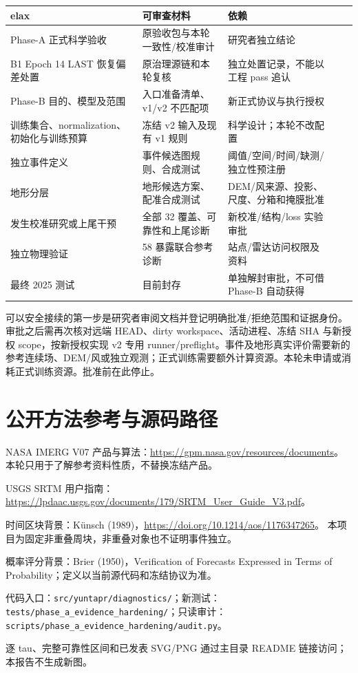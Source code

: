 \documentclass[UTF8,a4paper,10pt,fontset=fandol]{ctexart}
\begin{document}
\begin{center}\scriptsize\begin{longtable}{@{}p{}
elax}
elax}@{}}\toprule
事项 & 可审查材料 & 依赖\\
\midrule\endhead
Phase-A 正式科学验收 & 原验收包与本轮一致性/校准审计 & 研究者独立结论\\
B1 Epoch 14 LAST 恢复偏差处置 & 原治理源链和本轮复核 & 独立处置记录，不能以工程 pass 追认\\
Phase-B 目的、模型及范围 & 入口准备清单、v1/v2 不匹配项 & 新正式协议与执行授权\\
训练集合、normalization、初始化与训练预算 & 冻结 v2 输入及现有 v1 规则 & 科学设计；本轮不改配置\\
独立事件定义 & 事件候选图规则、合成测试 & 阈值/空间/时间/缺测/独立性预注册\\
地形分层 & 地形候选方案、配准合成测试 & DEM/风来源、投影、尺度、分箱和掩膜批准\\
发生校准研究或上尾干预 & 全部 32 覆盖、可靠性和上尾诊断 & 新校准/结构/loss 实验审批\\
独立物理验证 & 58 暴露联合参考诊断 & 站点/雷达访问权限及资料\\
最终 2025 测试 & 目前封存 & 单独解封审批，不可借 Phase-B 自动获得\\
\bottomrule\end{longtable}\end{center}\normalsize

可以安全接续的第一步是研究者审阅文档并登记明确批准/拒绝范围和证据身份。审批之后需再次核对远端 HEAD、dirty workspace、活动进程、冻结 SHA 与新授权 scope，按新授权实现 v2 专用 runner/preflight。事件及地形真实评价需要新的参考连续场、DEM/风或独立观测；正式训练需要额外计算资源。本轮未申请或消耗正式训练资源。批准前在此停止。\par
\clearpage\section*{公开方法参考与源码路径}
NASA IMERG V07 产品与算法：\url{https://gpm.nasa.gov/resources/documents}。
本轮只用于了解参考资料性质，不替换冻结产品。
\par USGS SRTM 用户指南：\url{https://lpdaac.usgs.gov/documents/179/SRTM_User_Guide_V3.pdf}。
\par 时间区块背景：K\"unsch (1989)，\url{https://doi.org/10.1214/aos/1176347265}。
本项目为固定非重叠周块，非重叠对象也不证明事件独立。
\par 概率评分背景：Brier (1950)，Verification of Forecasts Expressed in Terms of Probability；定义以当前源代码和冻结协议为准。
\par 代码入口：\texttt{src/yuntapr/diagnostics/}；新测试：\texttt{tests/phase\_a\_evidence\_hardening/}；只读审计：\texttt{scripts/phase\_a\_evidence\_hardening/audit.py}。
\par 逐 tau、完整可靠性区间和已发表 SVG/PNG 通过主目录 README 链接访问；本报告不生成新图。
\end{document}
